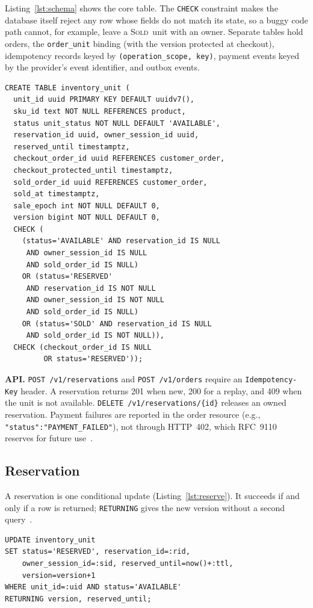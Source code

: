 \documentclass[conference]{IEEEtran}
\newcommand{\So}{\textsc{Sold}}
\begin{document}
Listing~\ref{lst:schema} shows the core table. The \texttt{CHECK}
constraint makes the database itself reject any row whose fields do
not match its state, so a buggy code path cannot, for example, leave a
\So\ unit with an owner. Separate tables hold orders, the
\texttt{order\_unit} binding (with the version protected at checkout),
idempotency records keyed by \texttt{(operation\_scope, key)},
payment events keyed by the provider's event identifier, and outbox
events.

\begin{lstlisting}[caption={Core unit table (abridged).}, label={lst:schema}]
CREATE TABLE inventory_unit (
  unit_id uuid PRIMARY KEY DEFAULT uuidv7(),
  sku_id text NOT NULL REFERENCES product,
  status unit_status NOT NULL DEFAULT 'AVAILABLE',
  reservation_id uuid, owner_session_id uuid,
  reserved_until timestamptz,
  checkout_order_id uuid REFERENCES customer_order,
  checkout_protected_until timestamptz,
  sold_order_id uuid REFERENCES customer_order,
  sold_at timestamptz,
  sale_epoch int NOT NULL DEFAULT 0,
  version bigint NOT NULL DEFAULT 0,
  CHECK (
    (status='AVAILABLE' AND reservation_id IS NULL
     AND owner_session_id IS NULL
     AND sold_order_id IS NULL)
    OR (status='RESERVED'
     AND reservation_id IS NOT NULL
     AND owner_session_id IS NOT NULL
     AND sold_order_id IS NULL)
    OR (status='SOLD' AND reservation_id IS NULL
     AND sold_order_id IS NOT NULL)),
  CHECK (checkout_order_id IS NULL
         OR status='RESERVED'));
\end{lstlisting}

\textbf{API.}
\texttt{POST /v1/reservations} and \texttt{POST /v1/orders} require
an \texttt{Idempotency-Key} header. A reservation returns 201 when
new, 200 for a replay, and 409 when the unit is not available.
\texttt{DELETE /v1/reservations/\{id\}} releases an owned reservation.
Payment failures are reported in the order resource (e.g.,
\texttt{"status":"PAYMENT\_FAILED"}), not through HTTP~402, which
RFC~9110 reserves for future use~\cite{refRFC9110}.

\subsection{Reservation}

A reservation is one conditional update (Listing~\ref{lst:reserve}).
It succeeds if and only if a row is returned; \texttt{RETURNING}
gives the new version without a second query~\cite{refPGIsolation}.

\begin{lstlisting}[caption={Atomic reservation.}, label={lst:reserve}]
UPDATE inventory_unit
SET status='RESERVED', reservation_id=:rid,
    owner_session_id=:sid, reserved_until=now()+:ttl,
    version=version+1
WHERE unit_id=:uid AND status='AVAILABLE'
RETURNING version, reserved_until;
\end{lstlisting}
\end{document}
